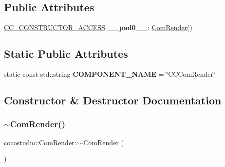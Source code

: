 \subsection*{Public Attributes}
\begin{DoxyCompactItemize}
\item 
\mbox{\label{classcocostudio_1_1ComRender_a14fb121312dd1d2996dbf4e145e57801}} 
\hyperlink{_2cocos2d_2cocos_2base_2ccConfig_8h_a25ef1314f97c35a2ed3d029b0ead6da0}{C\+C\+\_\+\+C\+O\+N\+S\+T\+R\+U\+C\+T\+O\+R\+\_\+\+A\+C\+C\+E\+SS} {\bfseries \+\_\+\+\_\+pad0\+\_\+\+\_\+}\+: \hyperlink{classcocostudio_1_1ComRender}{Com\+Render}()
\end{DoxyCompactItemize}
\subsection*{Static Public Attributes}
\begin{DoxyCompactItemize}
\item 
\mbox{\label{classcocostudio_1_1ComRender_a17128bc05f1a17849d4e7115cf4edd72}} 
static const std\+::string {\bfseries C\+O\+M\+P\+O\+N\+E\+N\+T\+\_\+\+N\+A\+ME} = \char`\"{}C\+C\+Com\+Render\char`\"{}
\end{DoxyCompactItemize}


\subsection{Constructor \& Destructor Documentation}
\mbox{\label{classcocostudio_1_1ComRender_ae223793e939c371c4957db61d2fbe639}} 
\subsubsection{\texorpdfstring{$\sim$\+Com\+Render()}{~ComRender()}\hspace{0.1cm}{\footnotesize\ttfamily [1/2]}}
{\footnotesize\ttfamily cocostudio\+::\+Com\+Render\+::$\sim$\+Com\+Render (\begin{DoxyParamCaption}{ }\end{DoxyParamCaption})\hspace{0.3cm}{\ttfamily [virtual]}}

